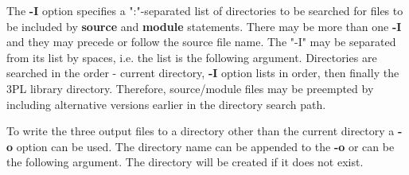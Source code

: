         The {\bf -I} option specifies a ":"-separated list of directories to be
        searched for files to be included by {\bf source} and {\bf module}
        statements. There may be more than one {\bf -I} and they may precede or
        follow the source file name. The "-I" may be separated from its list by
        spaces, i.e. the list is the following argument. Directories are searched
        in the order - current directory, {\bf -I} option lists in order, then
        finally the 3PL library directory. Therefore, source/module files may be
        preempted by including alternative versions earlier in the directory search
        path.
        
        To write the three output files to a directory other than the current
        directory a {\bf -o} option can be used. The directory name can
        be appended to the {\bf -o} or can be the following argument. The
        directory will be created if it does not exist.
        
